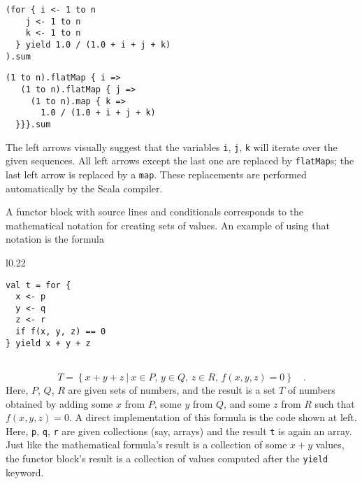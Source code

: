 \noindent \texttt{\textcolor{blue}{\footnotesize{}}}%
\begin{minipage}[c]{0.475\columnwidth}%
\texttt{\textcolor{blue}{\footnotesize{}}}
\begin{lstlisting}
(for { i <- 1 to n
    j <- 1 to n
    k <- 1 to n
  } yield 1.0 / (1.0 + i + j + k)
).sum
\end{lstlisting}
%
\end{minipage}\texttt{\textcolor{blue}{\footnotesize{}\hspace*{\fill}}}%
\begin{minipage}[c]{0.475\columnwidth}%
\texttt{\textcolor{blue}{\footnotesize{}}}
\begin{lstlisting}
(1 to n).flatMap { i =>
   (1 to n).flatMap { j =>
     (1 to n).map { k =>
       1.0 / (1.0 + i + j + k)
  }}}.sum
\end{lstlisting}
%
\end{minipage}{\footnotesize\par}

\vspace{0.2\baselineskip}
The left arrows visually suggest that the variables \lstinline!i!,
\lstinline!j!, \lstinline!k! will iterate over the given sequences.
All left arrows except the last one are replaced by \lstinline!flatMap!s;
the last left arrow is replaced by a \lstinline!map!. These replacements
are performed automatically by the Scala compiler.

A functor block with source lines and conditionals corresponds to
the mathematical notation for creating sets of values. An example
of using that notation is the formula

\begin{wrapfigure}{l}{0.22\columnwidth}%
\vspace{-0.6\baselineskip}
\begin{lstlisting}
val t = for {
  x <- p
  y <- q
  z <- r
  if f(x, y, z) == 0
} yield x + y + z
\end{lstlisting}
\vspace{0.6\baselineskip}
\end{wrapfigure}%

~\vspace{-0.3\baselineskip}
\[
T=\left\{ \left.x+y+z~\right|~x\in P,\,y\in Q,\,z\in R,\,f(x,y,z)=0\right\} \quad.
\]
Here, $P$, $Q$, $R$ are given sets of numbers, and the result is
a set $T$ of numbers obtained by adding some $x$ from $P$, some
$y$ from $Q$, and some $z$ from $R$ such that $f(x,y,z)=0$. A
direct implementation of this formula is the code shown at left. Here,
\lstinline!p!, \lstinline!q!, \lstinline!r! are given collections
(say, arrays) and the result \lstinline!t! is again an array. Just
like the mathematical formula\textsf{'}s result is a collection of some $x+y$
values, the functor block\textsf{'}s result is a collection of values computed
after the \lstinline!yield! keyword.


